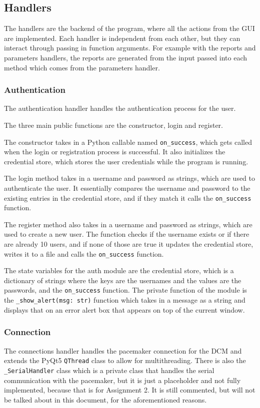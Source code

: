 \documentclass[12pt]{article}
\begin{document}
\subsection{Handlers}
The handlers are the backend of the program, where all the actions from the GUI are implemented.
Each handler is independent from each other, but they can interact through passing in function arguments.
For example with the reports and parameters handlers, the reports are generated from the input passed into each method which comes from the parameters handler.

\subsubsection{Authentication}
The authentication handler handles the authentication process for the user.

The three main public functions are the constructor, login and register.

The constructor takes in a Python callable named \verb|on_success|, which gets called when the login or registration process is successful.
It also initializes the credential store, which stores the user credentials while the program is running.

The login method takes in a username and password as strings, which are used to authenticate the user.
It essentially compares the username and password to the existing entries in the credential store, and if they match it calls the \verb|on_success| function.

The register method also takes in a username and password as strings, which are used to create a new user.
The function checks if the username exists or if there are already 10 users, and if none of those are true it updates the credential store, writes it to a file and calls the \verb|on_success| function.

The state variables for the auth module are the credential store, which is a dictionary of strings where the keys are the usernames and the values are the passwords, and the \verb|on_success| function.
The private function of the module is the \verb|_show_alert(msg: str)| function which takes in a message as a string and displays that on an error alert box that appears on top of the current window.

\subsubsection{Connection}
The connections handler handles the pacemaker connection for the DCM and extends the PyQt5 \verb|QThread| class to allow for multithreading.
There is also the \verb|_SerialHandler| class which is a private class that handles the serial communication with the pacemaker, but it is just a placeholder and not fully implemented, because that is for Assignment 2.
It is still commented, but will not be talked about in this document, for the aforementioned reasons.
\end{document}
